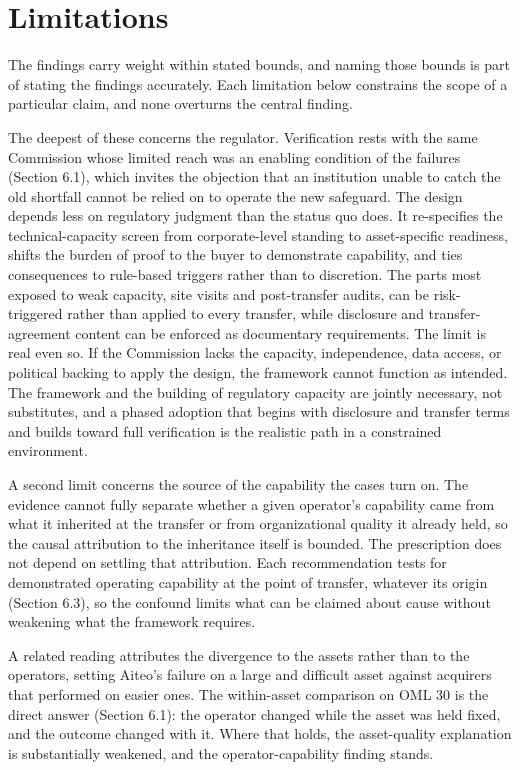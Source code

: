 \documentclass[twoside,fontset=lmodern]{mitthesis}
\begin{document}
\hypertarget{limitations}{%
\section{Limitations}\label{limitations}}

The findings carry weight within stated bounds, and naming those bounds
is part of stating the findings accurately. Each limitation below
constrains the scope of a particular claim, and none overturns the
central finding.

The deepest of these concerns the regulator. Verification rests with the
same Commission whose limited reach was an enabling condition of the
failures (Section 6.1), which invites the objection that an institution
unable to catch the old shortfall cannot be relied on to operate the new
safeguard. The design depends less on regulatory judgment than the
status quo does. It re-specifies the technical-capacity screen from
corporate-level standing to asset-specific readiness, shifts the burden
of proof to the buyer to demonstrate capability, and ties consequences
to rule-based triggers rather than to discretion. The parts most exposed
to weak capacity, site visits and post-transfer audits, can be
risk-triggered rather than applied to every transfer, while disclosure
and transfer-agreement content can be enforced as documentary
requirements. The limit is real even so. If the Commission lacks the
capacity, independence, data access, or political backing to apply the
design, the framework cannot function as intended. The framework and the
building of regulatory capacity are jointly necessary, not substitutes,
and a phased adoption that begins with disclosure and transfer terms and
builds toward full verification is the realistic path in a constrained
environment.

A second limit concerns the source of the capability the cases turn on.
The evidence cannot fully separate whether a given operator's capability
came from what it inherited at the transfer or from organizational
quality it already held, so the causal attribution to the inheritance
itself is bounded. The prescription does not depend on settling that
attribution. Each recommendation tests for demonstrated operating
capability at the point of transfer, whatever its origin (Section 6.3),
so the confound limits what can be claimed about cause without weakening
what the framework requires.

A related reading attributes the divergence to the assets rather than to
the operators, setting Aiteo's failure on a large and difficult asset
against acquirers that performed on easier ones. The within-asset
comparison on OML 30 is the direct answer (Section 6.1): the operator
changed while the asset was held fixed, and the outcome changed with it.
Where that holds, the asset-quality explanation is substantially
weakened, and the operator-capability finding stands.
\end{document}
